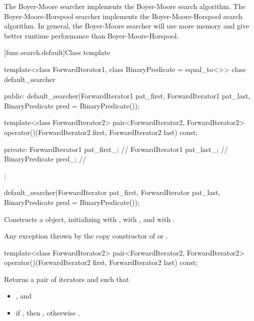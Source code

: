 \pnum
The Boyer-Moore searcher implements the Boyer-Moore search algorithm.
The Boyer-Moore-Horspool searcher implements the Boyer-Moore-Horspool search algorithm.
In general, the Boyer-Moore searcher will use more memory and give better runtime performance than Boyer-Moore-Horspool.

[func.search.default]{Class template }

%
\begin{codeblock}
template<class ForwardIterator1, class BinaryPredicate = equal_to<>>
  class default_searcher {
  public:
    default_searcher(ForwardIterator1 pat_first, ForwardIterator1 pat_last,
                     BinaryPredicate pred = BinaryPredicate());

    template<class ForwardIterator2>
      pair<ForwardIterator2, ForwardIterator2>
        operator()(ForwardIterator2 first, ForwardIterator2 last) const;

  private:
    ForwardIterator1 pat_first_;        // \expos
    ForwardIterator1 pat_last_;         // \expos
    BinaryPredicate pred_;              // \expos
  };
\end{codeblock}

%
\begin{itemdecl}
default_searcher(ForwardIterator pat_first, ForwardIterator pat_last,
                 BinaryPredicate pred = BinaryPredicate());
\end{itemdecl}

\begin{itemdescr}
\pnum
\effects
Constructs a  object, initializing 
with , \mbox{} with , and
 with .

\pnum
\throws
Any exception thrown by the copy constructor of  or
.
\end{itemdescr}

%
\begin{itemdecl}
template<class ForwardIterator2>
  pair<ForwardIterator2, ForwardIterator2>
    operator()(ForwardIterator2 first, ForwardIterator2 last) const;
\end{itemdecl}

\begin{itemdescr}
\pnum
\effects
Returns a pair of iterators  and  such that
\begin{itemize}
\item {}, and
\item if , then ,
otherwise .
\end{itemize}
\end{itemdescr}

